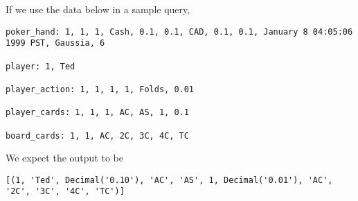 \documentclass{article}
\begin{document}
        If we use the data below in a sample query,
        \begin{verbatim}
poker_hand: 1, 1, 1, Cash, 0.1, 0.1, CAD, 0.1, 0.1, January 8 04:05:06 1999 PST, Gaussia, 6

player: 1, Ted

player_action: 1, 1, 1, 1, Folds, 0.01

player_cards: 1, 1, 1, AC, AS, 1, 0.1

board_cards: 1, 1, AC, 2C, 3C, 4C, TC
        \end{verbatim}
        We expect the output to be
        \begin{verbatim}
[(1, 'Ted', Decimal('0.10'), 'AC', 'AS', 1, Decimal('0.01'), 'AC', '2C', '3C', '4C', 'TC')]
        \end{verbatim}
\end{document}
